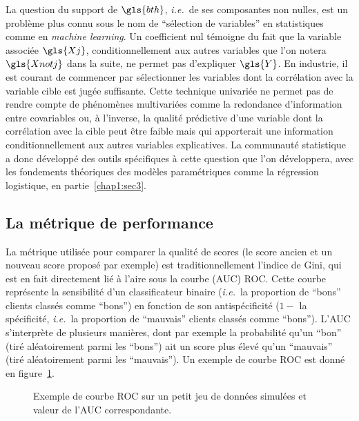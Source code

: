 La question du support  de $\gls{bth}$, \textit{i.e.}\ de ses composantes non nulles, est un problème plus connu sous le nom de ``sélection de variables'' en statistiques comme en \textit{machine learning}. Un coefficient nul témoigne du fait que la variable associée $\gls{Xj}$, conditionnellement aux autres variables que l'on notera $\gls{Xnotj}$ dans la suite, ne permet pas d'expliquer $\gls{Y}$. En industrie, il est courant de commencer par sélectionner les variables dont la corrélation avec la variable cible est jugée suffisante. Cette technique univariée ne permet pas de rendre compte de phénomènes multivariées comme la redondance d'information entre covariables ou, à l'inverse, la qualité prédictive d'une variable dont la corrélation avec la cible peut être faible mais qui apporterait une information conditionnellement aux autres variables explicatives. La communauté statistique a donc développé des outils spécifiques à cette question que l'on développera, avec les fondements théoriques des modèles paramétriques comme la régression logistique, en partie~\ref{chap1:sec3}.

\subsection{La métrique de performance} \label{subsec:gini}

La métrique utilisée pour comparer la qualité de \glspl{score} (le score ancien et un nouveau score proposé par exemple) est traditionnellement l'indice de Gini, qui est en fait directement lié à l'aire sous la courbe (AUC) ROC. Cette courbe représente la sensibilité d'un classificateur binaire (\textit{i.e.}\ la proportion de ``bons'' clients classés comme ``bons'') en fonction de son antispécificité ($1-$ la spécificité, \textit{i.e.}\ la proportion de ``mauvais'' clients classés comme ``bons''). L'AUC s'interprète de plusieurs manières, dont par exemple la probabilité qu'un ``bon'' (tiré aléatoirement parmi les ``bons'') ait un score plus élevé qu'un ``mauvais'' (tiré aléatoirement parmi les ``mauvais''). Un exemple de courbe ROC est donné en figure~\ref{fig:ROC}.

\begin{figure}
\centering \scalebox{.8}{}
\caption{\label{fig:ROC} Exemple de courbe ROC sur un petit jeu de données simulées et valeur de l'AUC correspondante.}
\end{figure}

